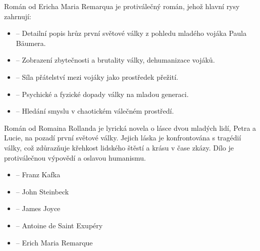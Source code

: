 \documentclass{article}
\begin{document}
\begin{mdframed}[backgroundcolor=DP,
	linecolor=WPP,
	linewidth=2pt,
	innertopmargin=5pt,
	innerbottommargin=5pt,
	innerleftmargin=5pt,
	innerrightmargin=5pt]\color{white}
\par
Román  od Ericha Maria Remarqua je protiválečný román, jehož hlavní rysy zahrnují:
\begin{itemize}[leftmargin=*]\setlength\itemsep{-12pt}
	\item {} -- Detailní popis hrůz první světové války z pohledu mladého vojáka Paula Bäumera. \\
	\item {} -- Zobrazení zbytečnosti a brutality války, dehumanizace vojáků. \\
	\item {} -- Síla přátelství mezi vojáky jako prostředek přežití. \\
	\item {} -- Psychické a fyzické dopady války na mladou generaci. \\
	\item {} -- Hledání smyslu v chaotickém válečném prostředí.
\end{itemize}
\end{mdframed}\vspace{-2pt}

\begin{mdframed}[backgroundcolor=DP,
	linecolor=WPP,
	linewidth=2pt,
	innertopmargin=5pt,
	innerbottommargin=5pt,
	innerleftmargin=5pt,
	innerrightmargin=5pt]\color{white}	
\par
Román  od Romaina Rollanda je lyrická novela o lásce dvou mladých lidí, Petra a Lucie, na pozadí první světové války. Jejich láska je konfrontována s tragédií války, což zdůrazňuje křehkost lidského štěstí a krásu v čase zkázy. Dílo je protiválečnou výpovědí a oslavou humanismu.
\end{mdframed}\vspace{-2pt}

\begin{mdframed}[backgroundcolor=DP,
	linecolor=WPP,
	linewidth=2pt,
	innertopmargin=5pt,
	innerbottommargin=5pt,
	innerleftmargin=5pt,
	innerrightmargin=5pt]\color{white}
	\begin{itemize}[leftmargin=*]\setlength\itemsep{-4pt}
	\item {} -- Franz Kafka
	\item {} -- John Steinbeck
	\item {} -- James Joyce
	\item {} -- Antoine de Saint Exupéry
	\item {} -- Erich Maria Remarque
	\end{itemize}
\end{mdframed}\vspace{-2pt}
\end{document}
